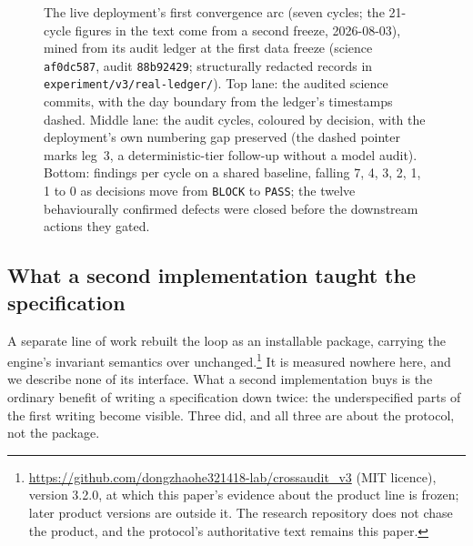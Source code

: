 \documentclass[11pt,letterpaper]{article}
\begin{document}
\begin{figure}[t]
{}
\caption{The live deployment's first convergence arc (seven cycles; the 21-cycle figures in the text come from a second freeze, 2026-08-03), mined from its audit ledger at the first data freeze (science \texttt{af0dc587}, audit \texttt{88b92429}; structurally redacted records in \texttt{experiment/v3/real-ledger/}). Top lane: the audited science commits, with the day boundary from the ledger's timestamps dashed. Middle lane: the audit cycles, coloured by decision, with the deployment's own numbering gap preserved (the dashed pointer marks leg~3, a deterministic-tier follow-up without a model audit). Bottom: findings per cycle on a shared baseline, falling 7, 4, 3, 2, 1, 1 to 0 as decisions move from \texttt{BLOCK} to \texttt{PASS}; the twelve behaviourally confirmed defects were closed before the downstream actions they gated.}
\label{fig:trace}
\end{figure}

\subsection{What a second implementation taught the specification}\label{sec:productline}

A separate line of work rebuilt the loop as an installable package, carrying the engine's invariant semantics over unchanged.\footnote{\url{https://github.com/dongzhaohe321418-lab/crossaudit_v3} (MIT licence), version 3.2.0, at which this paper's evidence about the product line is frozen; later product versions are outside it. The research repository does not chase the product, and the protocol's authoritative text remains this paper.} It is measured nowhere here, and we describe none of its interface. What a second implementation buys is the ordinary benefit of writing a specification down twice: the underspecified parts of the first writing become visible. Three did, and all three are about the protocol, not the package.
\end{document}
